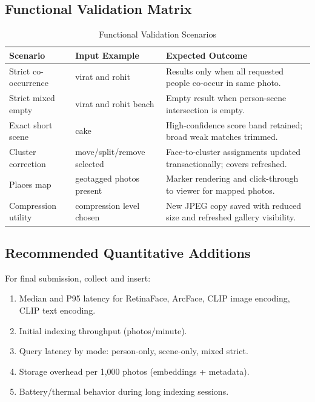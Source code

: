\documentclass[conference]{IEEEtran}
\begin{document}
\subsection{Functional Validation Matrix}
\begin{table}[t]
\caption{Functional Validation Scenarios}
\label{tab:functional}
\centering
\begin{tabular}{p{} p{} p{}}
\toprule
Scenario & Input Example & Expected Outcome \\
\midrule
Strict co-occurrence & virat and rohit & Results only when all requested people co-occur in same photo. \\
\midrule
Strict mixed empty & virat and rohit beach & Empty result when person-scene intersection is empty. \\
\midrule
Exact short scene & cake & High-confidence score band retained; broad weak matches trimmed. \\
\midrule
Cluster correction & move/split/remove selected & Face-to-cluster assignments updated transactionally; covers refreshed. \\
\midrule
Places map & geotagged photos present & Marker rendering and click-through to viewer for mapped photos. \\
\midrule
Compression utility & compression level chosen & New JPEG copy saved with reduced size and refreshed gallery visibility. \\
\bottomrule
\end{tabular}
\end{table}

\subsection{Recommended Quantitative Additions}
For final submission, collect and insert:
\begin{enumerate}
\item Median and P95 latency for RetinaFace, ArcFace, CLIP image encoding, CLIP text encoding.
\item Initial indexing throughput (photos/minute).
\item Query latency by mode: person-only, scene-only, mixed strict.
\item Storage overhead per 1,000 photos (embeddings + metadata).
\item Battery/thermal behavior during long indexing sessions.
\end{enumerate}
\end{document}
